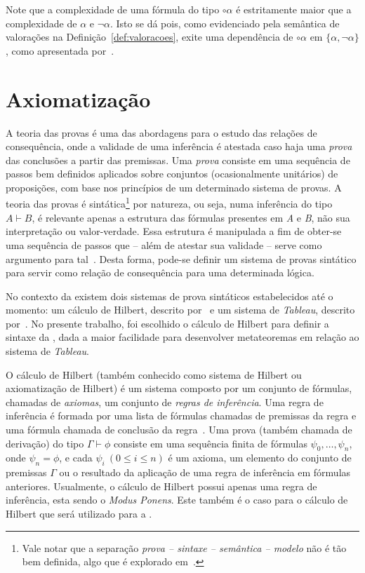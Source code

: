     Note que a complexidade de uma fórmula do tipo $\circ \alpha$ é estritamente maior que a complexidade de $\alpha$ e $\neg \alpha$. Isto se dá pois, como evidenciado pela semântica de valorações na Definição~\ref{def:valoracoes}, exite uma dependência de $\circ \alpha$ em $\{\alpha, \neg \alpha\}$, como apresentada por~.

\section{Axiomatização}
\label{sec:axiomatizacao}

    A teoria das provas é uma das abordagens para o estudo das relações de consequência, onde a validade de uma inferência é atestada caso haja uma \textit{prova} das conclusões a partir das premissas. Uma \textit{prova} consiste em uma sequência de passos bem definidos aplicados sobre conjuntos (ocasionalmente unitários) de proposições, com base nos princípios de um determinado sistema de provas. A teoria das provas é sintática\footnote{Vale notar que a separação \textit{prova {--} sintaxe {--} semântica {--} modelo} não é tão bem definida, algo que é explorado em~.} por natureza, ou seja, numa inferência do tipo $A \vdash B$, é relevante apenas a estrutura das fórmulas presentes em \textit{A} e \textit{B}, não sua interpretação ou valor-verdade. Essa estrutura é manipulada a fim de obter-se uma sequência de passos que {--} além de atestar sua validade {--} serve como argumento para tal~\cite{sep-logical-consequence}. Desta forma, pode-se definir um sistema de provas sintático para servir como relação de consequência para uma determinada lógica. 

    No contexto da \lfium{} existem dois sistemas de prova sintáticos estabelecidos até o momento: um cálculo de Hilbert, descrito por~ e um sistema de \textit{Tableau}, descrito por~. No presente trabalho, foi escolhido o cálculo de Hilbert para definir a sintaxe da \lfium{}, dada a maior facilidade para desenvolver metateoremas em relação ao sistema de \textit{Tableau}.

    O cálculo de Hilbert (também conhecido como sistema de Hilbert ou axiomatização de Hilbert) é um sistema composto por um conjunto de fórmulas, chamadas de \textit{axiomas}, um conjunto de \textit{regras de inferência}. Uma regra de inferência é formada por uma lista de fórmulas chamadas de premissas da regra e uma fórmula chamada de conclusão da regra~\cite{Restall1999-RESAIT-4}. Uma prova (também chamada de derivação) do tipo $\Gamma \vdash \phi$ consiste em uma sequência finita de fórmulas \(\psi_0, \dots, \psi_n\), onde \(\psi_n = \phi\), e cada  $\psi_i\ (0 \leq i \leq n)$ é um axioma, um elemento do conjunto de premissas $\Gamma$ ou o resultado da aplicação de uma regra de inferência em fórmulas anteriores. Usualmente, o cálculo de Hilbert possui apenas uma regra de inferência, esta sendo o \textit{Modus Ponens}. Este também é o caso para o cálculo de Hilbert que será utilizado para a \lfium{}.
    
